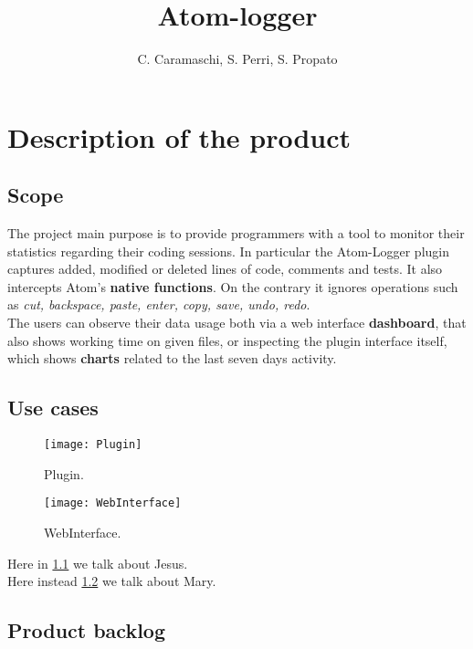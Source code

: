 \documentclass[a4paper,12pt]{report}
\title{Atom-logger}
\author{C. Caramaschi, S. Perri, S. Propato}
\begin{document}
\maketitle
\tableofcontents

\newpage

\chapter{Description of the product}

\section{Scope}

	The project main purpose is to provide programmers with a tool to monitor their statistics regarding their coding sessions.
	In particular the Atom-Logger plugin captures added, modified or deleted lines of code, comments and tests. It also intercepts Atom's \textbf{native functions}. On the contrary it ignores operations such as \emph{cut, backspace, paste, enter, copy, save, undo, redo}.\\
	The users can observe their data usage both via a web interface \textbf{dashboard}, that also shows working time on given files, or inspecting the plugin interface itself, which shows \textbf{charts} related to the last seven days activity. 

\section{Use cases}


\begin{figure}[H]
	\centering
    \texttt{[image: Plugin]}
    \caption{Plugin.}
    \label{fig:plugin}
\end{figure}

\begin{figure}[H]
	\centering
    \texttt{[image: WebInterface]}
    \caption{WebInterface.}
    \label{fig:web}
\end{figure}

Here in \ref{fig:plugin} we talk about Jesus.\\
Here instead \ref{fig:web} we talk about Mary.\\


\section{Product backlog}
\newpage
\end{document}
